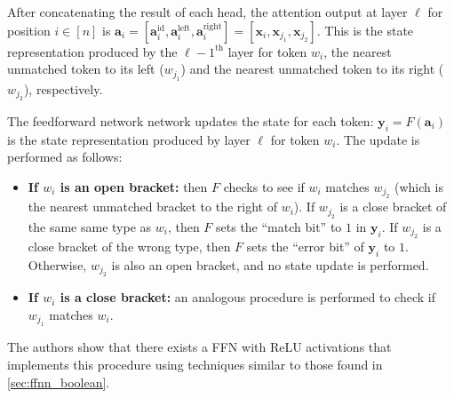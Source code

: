 After concatenating the result of each head, the attention output at layer $\ell$ for position $i \in [n]$ is $\mathbf{a}_{i} = [\mathbf{a}_{i}^{\mathrm{id}}, \mathbf{a}_{i}^{\mathrm{left}}, \mathbf{a}_{i}^{\mathrm{right}}] = [\mathbf{x}_{i}, \mathbf{x}_{j_1}, \mathbf{x}_{j_2}]$. This is the state representation produced by the $\ell-1^{\text{th}}$ layer for token $w_i$, the nearest unmatched token to its left ($w_{j_1}$) and the nearest unmatched token to its right ($w_{j_2}$), respectively.

The feedforward network network updates the state for each token: $\mathbf{y}_i = F(\mathbf{a}_i)$ is the state representation produced by layer $\ell$ for token $w_i$. The update is performed as follows:
\begin{itemize}
    \item \textbf{If $w_i$ is an open bracket:} then $F$ checks to see if $w_i$ matches $w_{j_2}$ (which is the nearest unmatched bracket to the right of $w_i$). If $w_{j_2}$ is a close bracket of the same same type as $w_i$, then $F$ sets the ``match bit'' to $1$ in $\mathbf{y}_i$. If $w_{j_2}$ is a close bracket of the wrong type, then $F$ sets the ``error bit'' of $\mathbf{y}_i$ to $1$. Otherwise, $w_{j_2}$ is also an open bracket, and no state update is performed.
    \item \textbf{If $w_i$ is a close bracket:} an analogous procedure is performed to check if $w_{j_1}$ matches $w_i$.
\end{itemize}
The authors show that there exists a FFN with ReLU activations that implements this procedure using techniques similar to those found in \cref{sec:ffnn_boolean}.

